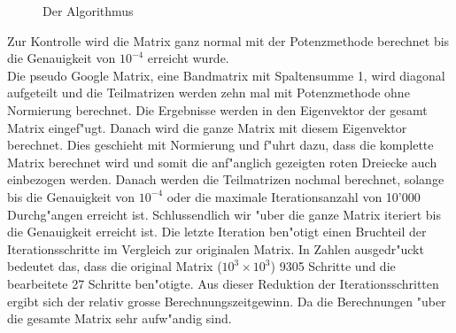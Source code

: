 \begin{refsection}
\begin{figure}[H]
\begin{center}
    \end{center}
\caption{Der Algorithmus}
\label{12}
\end{figure}

 
Zur Kontrolle wird die Matrix ganz normal mit der Potenzmethode berechnet bis die Genauigkeit von $10^{-4}$ erreicht wurde.\\
  Die pseudo Google Matrix, eine Bandmatrix mit Spaltensumme 1, wird diagonal aufgeteilt und die Teilmatrizen werden zehn mal mit Potenzmethode ohne Normierung berechnet. Die Ergebnisse werden in den Eigenvektor der gesamt Matrix eingef"ugt. Danach wird die ganze Matrix mit diesem Eigenvektor berechnet. Dies geschieht mit Normierung und f"uhrt dazu, dass die komplette Matrix berechnet wird und somit die anf"anglich gezeigten roten Dreiecke auch einbezogen werden. Danach werden die Teilmatrizen nochmal berechnet, solange bis die Genauigkeit von $10^{-4}$ oder die maximale Iterationsanzahl von 10'000 Durchg"angen erreicht ist. Schlussendlich wir "uber die ganze Matrix iteriert bis die Genauigkeit erreicht ist. Die letzte Iteration ben"otigt einen Bruchteil der Iterationsschritte im Vergleich zur originalen Matrix. In Zahlen ausgedr"uckt bedeutet das, dass die original Matrix ($10^3\times10^3$) 9305 Schritte und die bearbeitete 27 Schritte ben"otigte. Aus dieser Reduktion der Iterationsschritten ergibt sich der relativ grosse Berechnungszeitgewinn. Da die Berechnungen "uber die gesamte Matrix sehr aufw"andig sind. 

\end{refsection}
